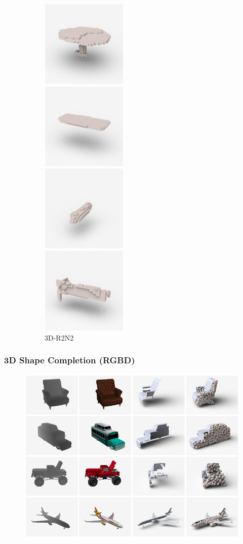 \documentclass[14pt]{beamer}
\begin{document}
\begin{frame}
\begin{figure}
\begin{subfigure}[t]{0.18\textwidth}
        \includegraphics[scale=0.39]{qual_rgb_3d}\\
        {\footnotesize 3D-R2N2 \cite{Choy:2016}}
      \end{subfigure}
    \end{figure}
  \end{frame}
  
  \begin{frame}
    \frametitle{3D Shape Completion (RGBD)}
    
    \begin{figure}
      \centering
      \includegraphics[scale=0.5]{shape_completion}
    \end{figure}
  \end{frame}
  
\end{document}
